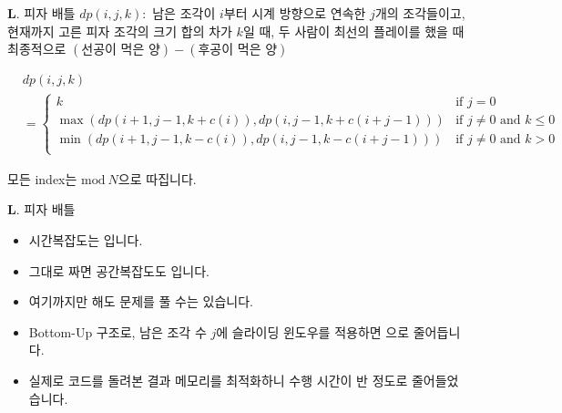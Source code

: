 \begin{frame}{\textbf{L}. 피자 배틀}
    $dp(i,j,k):$ 남은 조각이 $i$부터 시계 방향으로 연속한 $j$개의 조각들이고, 현재까지 고른 피자 조각의 크기 합의 차가 $k$일 때, 두 사람이 최선의 플레이를 했을 때 최종적으로 $(\textrm{선공이 먹은 양})-(\textrm{후공이 먹은 양})$
    
    \begin{align*}
        &dp\left(i,j,k\right)\\
        &=\begin{cases}
            k & \textrm{if } j=0 \\
            \max (dp(i+1,j-1,k+c(i)),dp(i,j-1,k+c(i+j-1))) & \textrm{if } j \neq 0 \textrm{ and } k \leq 0 \\
            \min (dp(i+1,j-1,k-c(i)),dp(i,j-1,k-c(i+j-1))) & \textrm{if } j \neq 0 \textrm{ and } k > 0 \\
        \end{cases}
    \end{align*}

    모든 index는 $\textrm{mod}\ N$으로 따집니다.
\end{frame}

\begin{frame}{\textbf{L}. 피자 배틀}
    \begin{itemize}
        \item 시간복잡도는 입니다.
        \item 그대로 짜면 공간복잡도도 입니다.
        \item 여기까지만 해도 문제를 풀 수는 있습니다.
        \item Bottom-Up 구조로, 남은 조각 수 $j$에 슬라이딩 윈도우를 적용하면 으로 줄어듭니다.
        \item 실제로 코드를 돌려본 결과 메모리를 최적화하니 수행 시간이 반 정도로 줄어들었습니다.
    \end{itemize}
\end{frame}

